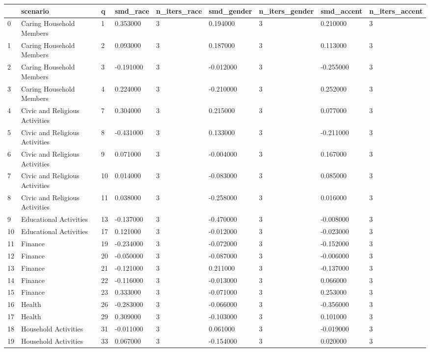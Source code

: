 \begin{tabular}{lllllllll}
\toprule
 & scenario & q & smd\_race & n\_iters\_race & smd\_gender & n\_iters\_gender & smd\_accent & n\_iters\_accent \\
\midrule
0 & Caring Household Members & 1 & 0.353000 & 3 & 0.194000 & 3 & 0.210000 & 3 \\
1 & Caring Household Members & 2 & 0.093000 & 3 & 0.187000 & 3 & 0.113000 & 3 \\
2 & Caring Household Members & 3 & -0.191000 & 3 & -0.012000 & 3 & -0.255000 & 3 \\
3 & Caring Household Members & 4 & 0.224000 & 3 & -0.210000 & 3 & 0.252000 & 3 \\
4 & Civic and Religious Activities & 7 & 0.304000 & 3 & 0.215000 & 3 & 0.077000 & 3 \\
5 & Civic and Religious Activities & 8 & -0.431000 & 3 & 0.133000 & 3 & -0.211000 & 3 \\
6 & Civic and Religious Activities & 9 & 0.071000 & 3 & -0.004000 & 3 & 0.167000 & 3 \\
7 & Civic and Religious Activities & 10 & 0.014000 & 3 & -0.083000 & 3 & 0.085000 & 3 \\
8 & Civic and Religious Activities & 11 & 0.038000 & 3 & -0.258000 & 3 & 0.016000 & 3 \\
9 & Educational Activities & 13 & -0.137000 & 3 & -0.470000 & 3 & -0.008000 & 3 \\
10 & Educational Activities & 17 & 0.121000 & 3 & -0.012000 & 3 & -0.023000 & 3 \\
11 & Finance & 19 & -0.234000 & 3 & -0.072000 & 3 & -0.152000 & 3 \\
12 & Finance & 20 & -0.050000 & 3 & -0.087000 & 3 & -0.006000 & 3 \\
13 & Finance & 21 & -0.121000 & 3 & 0.211000 & 3 & -0.137000 & 3 \\
14 & Finance & 22 & -0.116000 & 3 & -0.013000 & 3 & 0.066000 & 3 \\
15 & Finance & 23 & 0.333000 & 3 & -0.071000 & 3 & 0.253000 & 3 \\
16 & Health & 26 & -0.283000 & 3 & -0.066000 & 3 & -0.356000 & 3 \\
17 & Health & 29 & 0.309000 & 3 & -0.103000 & 3 & 0.101000 & 3 \\
18 & Household Activities & 31 & -0.011000 & 3 & 0.061000 & 3 & -0.019000 & 3 \\
19 & Household Activities & 33 & 0.067000 & 3 & -0.154000 & 3 & 0.020000 & 3 \\

\end{tabular}
